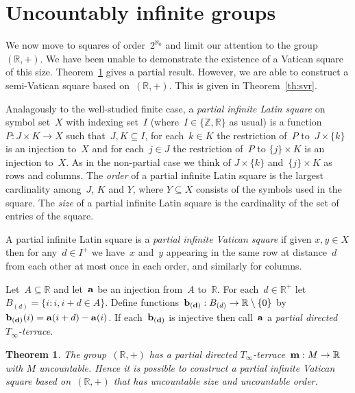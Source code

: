 \documentclass[12pt,a4paper]{article}
\newtheorem{thm}{Theorem}
\newcommand{\Z}{\mathbb{Z}}
\newcommand{\R}{\mathbb{R}}
\begin{document}
\section{Uncountably infinite groups}\label{sec:uncgps}

We now move to squares of order~$2^{\aleph_0}$ and limit our attention to the group~$(\R,+)$.
We have been unable to demonstrate the existence of a Vatican square of this size.  Theorem~\ref{th:part} gives a partial result.   However, we are able to construct a semi-Vatican square based on~$(\R,+)$.  This is given in Theorem~\ref{th:svr}.


Analagously to the well-studied finite case, a {\em partial infinite Latin square} on symbol set~$X$ with indexing set~$I$ (where~$I \in \{\Z, \R\}$ as usual) is a function~$P: J \times K \rightarrow X$ such that~$J,K \subseteq I$,  for each~$k \in K$ the restriction of~$P$ to~$J\times \{k\}$ is an injection to~$X$ and for each~$j \in J$ the restriction of~$P$ to $\{j\} \times K$ is an injection to~$X$.  As in the non-partial case we think of $J\times \{k\}$ and~$\{j\} \times K$ as rows and columns.  The {\em order} of a partial infinite Latin square is the largest cardinality among~$J$, $K$ and $Y$, where $Y \subseteq X$ consists of the symbols used in the square.  The {\em size} of a partial infinite Latin square is the cardinality of the set of entries of the square.

A partial infinite Latin square is a {\em partial infinite Vatican square} if given $x,y \in X$ then for any~$d \in I^+$ we have~$x$ and~$y$ appearing in the same row at distance~$d$ from each other at most once in each order, and similarly for columns.


Let~$A \subseteq \R$  and let~${\bf a}$ be an injection from~$A$ to~$\R$.  For each~$d \in \R^+$ let $B_{(d)} = \{ i : i,  i+d \in A\}$.  Define functions~${\bf b_{(d)}}: B_{(d)} \rightarrow \R \setminus \{0\}$ by ${\bf b_{(d)}}(i) = {\bf a}(i+d) - {\bf a}(i)$.  If 
each~${\bf b_{(d)}}$ is injective then call~${\bf a}$ a {\em partial directed  $T_{\infty}$-terrace}.



\begin{thm}\label{th:part}
The group~$(\R, +)$  has a partial directed $T_{\infty}$-terrace~${\bf m}:M \rightarrow \R$ with $M$ uncountable. Hence it is possible to construct a partial infinite Vatican square based on~$(\R,+)$ that has uncountable size and uncountable order.
\end{thm}
\end{document}
